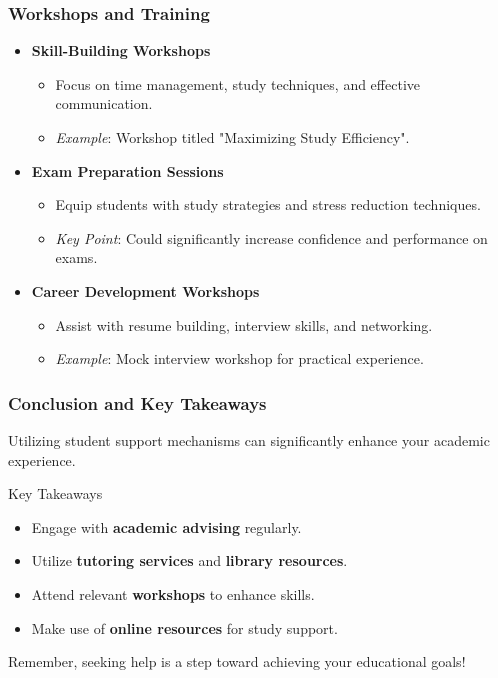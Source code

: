 \documentclass[aspectratio=169]{beamer}
\begin{document}
\begin{frame}[fragile]
    \frametitle{Workshops and Training}
    \begin{itemize}
        \item \textbf{Skill-Building Workshops}
            \begin{itemize}
                \item Focus on time management, study techniques, and effective communication.
                \item \textit{Example}: Workshop titled "Maximizing Study Efficiency".
            \end{itemize}

        \item \textbf{Exam Preparation Sessions}
            \begin{itemize}
                \item Equip students with study strategies and stress reduction techniques.
                \item \textit{Key Point}: Could significantly increase confidence and performance on exams.
            \end{itemize}

        \item \textbf{Career Development Workshops}
            \begin{itemize}
                \item Assist with resume building, interview skills, and networking.
                \item \textit{Example}: Mock interview workshop for practical experience.
            \end{itemize}
    \end{itemize}
\end{frame}

\begin{frame}[fragile]
    \frametitle{Conclusion and Key Takeaways}
    Utilizing student support mechanisms can significantly enhance your academic experience. 
    \begin{block}{Key Takeaways}
        \begin{itemize}
            \item Engage with \textbf{academic advising} regularly.
            \item Utilize \textbf{tutoring services} and \textbf{library resources}.
            \item Attend relevant \textbf{workshops} to enhance skills.
            \item Make use of \textbf{online resources} for study support.
        \end{itemize}
    \end{block}
    Remember, seeking help is a step toward achieving your educational goals!
\end{frame}
\end{document}
